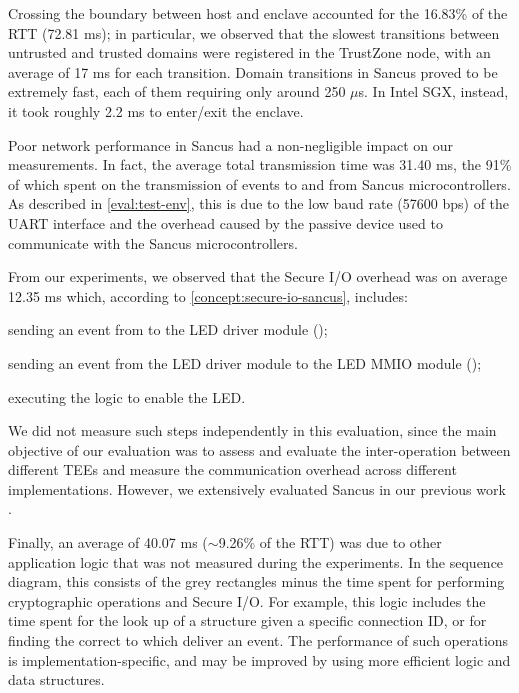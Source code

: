 Crossing the boundary between host and enclave accounted for the 16.83\% of the
\ac{RTT} (72.81 ms); in particular, we observed that the slowest transitions
between untrusted and trusted domains were registered in the TrustZone node,
with an average of 17 ms for each transition. Domain transitions in Sancus
proved to be extremely fast, each of them requiring only around 250 $\mu$s. In
Intel \ac{SGX}, instead, it took roughly 2.2 ms to enter/exit the enclave.

Poor network performance in Sancus had a non-negligible impact on our
measurements. In fact, the average total transmission time was 31.40 ms, the
91\% of which spent on the transmission of events to and from Sancus
microcontrollers. As described in \cref{eval:test-env}, this is due to the low
baud rate (57600 bps) of the UART interface and the overhead caused by the
passive device used to communicate with the Sancus microcontrollers.

From our experiments, we observed that the Secure I/O overhead was on average
12.35 ms which, according to \cref{concept:secure-io-sancus}, includes:
%
\begin{paraenum}
  \item sending an event from \light{} to the LED driver module
  ();
  \item sending an event from the LED driver module to the LED \ac{MMIO} module
  ();
  \item executing the logic to enable the LED.
\end{paraenum}
%
We did not measure such steps independently in this evaluation, since the main
objective of our evaluation was to assess and evaluate the inter-operation
between different \acp{TEE} and measure the communication overhead across
different implementations. However, we extensively evaluated Sancus in our
previous work \cite{noorman:authentic-execution}.

Finally, an average of 40.07 ms ($\sim$9.26\% of the \ac{RTT}) was due to other
application logic that was not measured during the experiments. In the sequence
diagram, this consists of the grey rectangles minus the time spent for
performing cryptographic operations and Secure I/O. For example, this logic
includes the time spent for the look up of a \conn{} structure given a specific
connection ID, or for finding the correct \protmod{} to which deliver an event.
The performance of such operations is implementation-specific, and may be
improved by using more efficient logic and data structures.

